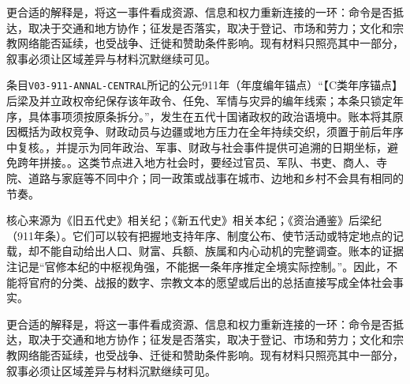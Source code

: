 更合适的解释是，将这一事件看成资源、信息和权力重新连接的一环：命令是否抵达，取决于交通和地方协作；征发是否落实，取决于登记、市场和劳力；文化和宗教网络能否延续，也受战争、迁徙和赞助条件影响。现有材料只照亮其中一部分，叙事必须让区域差异与材料沉默继续可见。

条目\texttt{V03-911-ANNAL-CENTRAL}所记的公元911年（年度编年锚点）“【C类年序锚点】后梁及并立政权帝纪保存该年政令、任免、军情与灾异的编年线索；本条只锁定年序，具体事项须按原条拆分。”，发生在五代十国诸政权的政治语境中。账本将其原因概括为政权竞争、财政动员与边疆或地方压力在全年持续交织，须置于前后年序中复核。，并提示为同年政治、军事、财政与社会事件提供可追溯的日期坐标，避免跨年拼接。。这类节点进入地方社会时，要经过官员、军队、书吏、商人、寺院、道路与家庭等不同中介；同一政策或战事在城市、边地和乡村不会具有相同的节奏。

核心来源为《旧五代史》相关纪；《新五代史》相关本纪；《资治通鉴》后梁纪（911年条）。它们可以较有把握地支持年序、制度公布、使节活动或特定地点的记载，却不能自动给出人口、财富、兵额、族属和内心动机的完整调查。账本的证据注记是“官修本纪的中枢视角强，不能据一条年序推定全境实际控制。”。因此，不能将官府的分类、战报的数字、宗教文本的愿望或后出的总括直接写成全体社会事实。

更合适的解释是，将这一事件看成资源、信息和权力重新连接的一环：命令是否抵达，取决于交通和地方协作；征发是否落实，取决于登记、市场和劳力；文化和宗教网络能否延续，也受战争、迁徙和赞助条件影响。现有材料只照亮其中一部分，叙事必须让区域差异与材料沉默继续可见。
